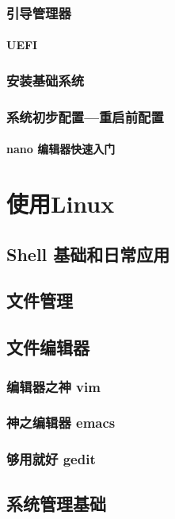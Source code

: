 \documentclass[amstex,twoside]{ctexbook}
\begin{document}
\subsection{引导管理器}
\subsubsection{UEFI}

\subsection{安装基础系统}
\subsection{系统初步配置—重启前配置}

\subsubsection{nano 编辑器快速入门}

\chapter{使用Linux}
\section{Shell 基础和日常应用}

\section{文件管理}	
\section{文件编辑器}
\subsection{编辑器之神 vim	}
\subsection{神之编辑器 emacs	}
\subsection{够用就好 gedit	}
\section{系统管理基础}
\end{document}
